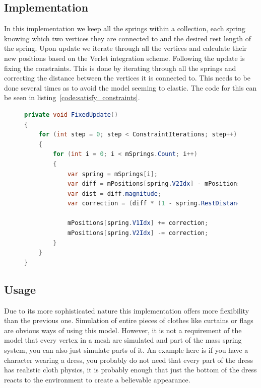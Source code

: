 %

\subsection{Implementation}
In this implementation we keep all the springs within a collection, each spring knowing which two vertices they are connected to and the desired rest length of the spring.
Upon update we iterate through all the vertices and calculate their new positions based on the Verlet integration scheme.
Following the update is fixing the constraints. This is done by iterating through all the springs and correcting the distance between the vertices it is connected to.
This needs to be done several times as to avoid the model seeming to elastic.
The code for this can be seen in listing~\ref{code:satisfy_constraints}.


\begin{figure}
\begin{lstlisting}[label={code:satisfy_constraints},language=csharp,caption={Semi-Implicit Euler Integration}]
private void FixedUpdate()
{
    for (int step = 0; step < ConstraintIterations; step++)
    {
        for (int i = 0; i < mSprings.Count; i++)
        {
            var spring = mSprings[i];
            var diff = mPositions[spring.V2Idx] - mPositions[spring.V1Idx];
            var dist = diff.magnitude;
            var correction = (diff * (1 - spring.RestDistance / dist)) * 0.5f;

            mPositions[spring.V1Idx] += correction;
            mPositions[spring.V2Idx] -= correction;
        }
    }
}
\end{lstlisting}
\end{figure}

\subsection{Usage}
Due to its more sophisticated nature this implementation offers more flexibility than the previous one.
Simulation of entire pieces of clothes like curtains or flags are obvious ways of using this model.
However, it is not a requirement of the model that every vertex in a mesh are simulated and part of the mass spring system, you can also just simulate parts of it.
An example here is if you have a character wearing a dress, you probably do not need that every part of the dress
has realistic cloth physics, it is probably enough that just the bottom of the dress reacts to the environment
to create a believable appearance.


